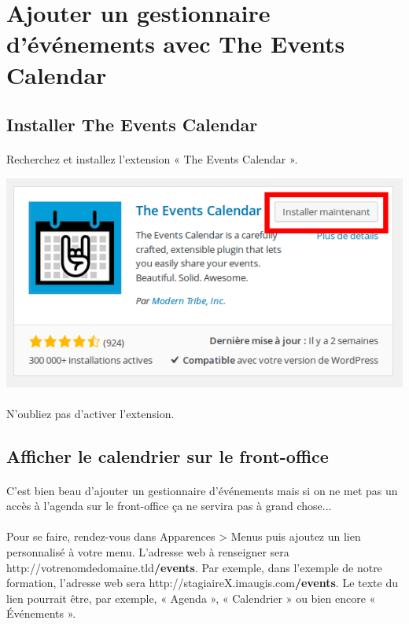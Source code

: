 \documentclass[10pt,a4paper]{article}
\begin{document}
\section{Ajouter un gestionnaire d'événements avec The Events Calendar}
\subsection{Installer The Events Calendar}
\paragraph{}Recherchez et installez l'extension « The Events Calendar ».
\begin{center}
\includegraphics[scale=0.3]{img/0193.png}
\end{center}
\paragraph{}N'oubliez pas d'activer l'extension.
\subsection{Afficher le calendrier sur le front-office}
\paragraph{}C'est bien beau d'ajouter un gestionnaire d'événements mais si on ne met pas un accès à l'agenda sur le front-office ça ne servira pas à grand chose...
\paragraph{}Pour se faire, rendez-vous dans Apparences > Menus puis ajoutez un lien personnalisé à votre menu. L'adresse web à renseigner sera http://votrenomdedomaine.tld\textbf{/events}. Par exemple, dans l'exemple de notre formation, l'adresse web sera http://stagiaireX.imaugis.com\textbf{/events}. Le texte du lien pourrait être, par exemple, « Agenda », « Calendrier » ou bien encore « Événements ».
\end{document}
